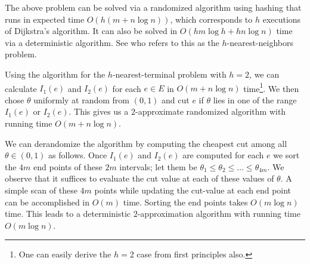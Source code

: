 \documentclass[11pt]{article}
\newtheorem{prob}{Problem}
\def\bx{\textbf{x}}
\begin{document}
The above problem can be solved via a randomized algorithm using
hashing that runs in expected time $O(h (m + n \log n))$, which
corresponds to $h$ executions of Dijkstra's algorithm.  It can also be
solved in $O(h m\log h + h n \log n)$ time via a deterministic
algorithm. See \cite{HarPeled15} who refers to this as the
$h$-nearest-neighbors problem.

Using the algorithm for the $h$-nearest-terminal problem with $h=2$,
we can calculate $I_1(e)$ and $I_2(e)$ for each $e \in E$ in $O(m + n
\log n)$ time\footnote{One can easily derive the $h=2$ case from first
  principles also.}.  We then chose $\theta$ uniformly at random from
$(0,1)$ and cut $e$ if $\theta$ lies in one of the range $I_1(e)$ or
$I_2(e)$. This gives us a $2$-approximate randomized algorithm with
running time $O(m + n \log n)$.


\iffalse
\begin{prob}
  Given a directed $G=(V,E)$ with non-negative edge-weights, a subset
  $S \subset V(G)$ of terminals, for each vertex $v$, find two closest
  vertices(and distances) in $S$ i.e. find $s_1,s_2\in S$ and
  $d(s_1,v), d(s_2,v)$ such that $\forall s \in S \setminus
  \{s_1,s_2\}$, we have $d(s,v) \geq d(s_2,v) \geq d(s_1,v)$. Here,
  $d(a,b)$ denotes the shortest path length from $a$ to $b$ using edge
  lengths given by $\bx$.
\end{prob}
This problem, referred to as the can be solved in $O(m + n \log n)$
time \cite{HarPeled15}.
\fi


We can derandomize the algorithm by computing the cheapest cut among
all $\theta \in (0,1)$ as follows. Once $I_1(e)$ and $I_2(e)$ are
computed for each $e$ we sort the $4m$ end points of these $2m$
intervals; let them be $\theta_1 \le \theta_2 \le \ldots \le
\theta_{4m}$.  We observe that it suffices to evaluate the cut value
at each of these values of $\theta$.  A simple scan of these $4m$
points while updating the cut-value at each end point can be
accomplished in $O(m)$ time. Sorting the end points takes $O(m \log
n)$ time.  This leads to a deterministic $2$-approximation algorithm
with running time $O(m \log n)$.

\iffalse
\end{document}
